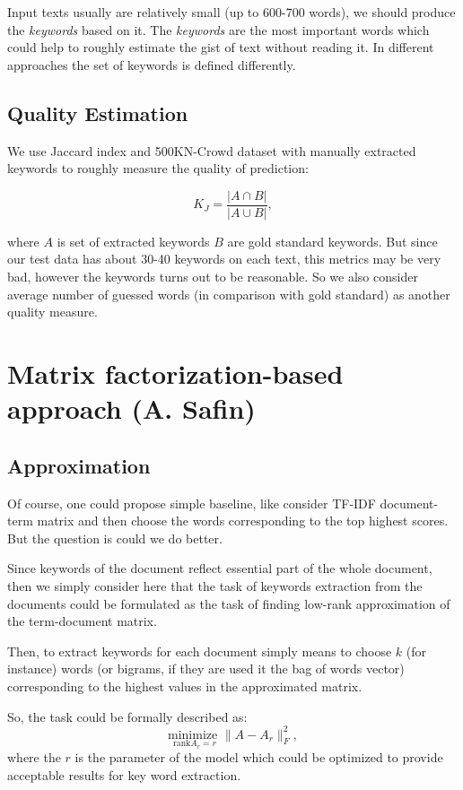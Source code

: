 \documentclass[a4paper]{article}
\begin{document}
Input texts usually are relatively small (up to 600-700 words), we should produce the \textit{keywords} based on it. The \textit{keywords} are the most important words which could help to roughly estimate the gist of text without reading it. In different approaches the set of keywords is defined differently.

\subsection*{Quality Estimation}

We use Jaccard index and 500KN-Crowd dataset \cite{Marujo:LREC:2012} with manually extracted keywords to roughly measure the quality of prediction:

$$
K_J = \frac{\vert A \cap B \vert}{\vert A \cup B\vert},
$$

where $A$ is set of extracted keywords $B$ are gold standard keywords. But since our test data has about 30-40 keywords on each text, this metrics may be very bad, however the keywords turns out to be reasonable. So we also consider average number of guessed words (in comparison with gold standard) as another quality measure. 

\section*{Matrix factorization-based approach (A. Safin)}

\subsection*{Approximation}

Of course, one could propose simple baseline, like consider TF-IDF document-term matrix and then choose the words  corresponding to the top highest scores. But the question is could we do better.   

Since keywords of the document reflect essential part of the whole document, then we simply consider here that the task of keywords extraction from the documents could be formulated as  the task of finding low-rank approximation of the term-document matrix. 

Then, to extract keywords for each document simply means to choose $k$ (for instance) words (or bigrams, if they are used it the bag of words vector) corresponding to the highest values in the approximated matrix.

So, the task could be formally described as:
$$
\underset{\text{rank}A_r = r}{\text{minimize }} \|A - A_{r}\|_{F}^2,
$$
where the $r$ is the parameter of the model which could be optimized to provide acceptable results for key word extraction.
\end{document}

